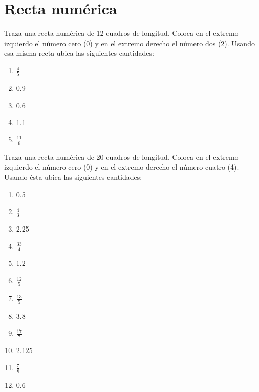 \documentclass[11pt]{article}
\begin{document}
\vspace{1cm}

\section{Recta num\'erica}

Traza una recta num\'erica de 12 cuadros de longitud. Coloca en el extremo
izquierdo el n\'umero cero (0) y en el extremo derecho el n\'umero dos (2).
Usando esa misma recta ubica las siguientes cantidades: \hspace{5mm}
\begin{multicols}{5}
\begin{enumerate}[label=\alph*)] \itemsep-.3em
\item $\displaystyle\frac{4}{5} $ \hspace{5mm} 
\item 0.9 \hspace{5mm} 
\item 0.6 \hspace{5mm} 
\item 1.1 \hspace{5mm}
\item $\displaystyle\frac{11}{6} $
\end{enumerate}
\end{multicols}

\vspace{1cm}

Traza una recta num\'erica de 20 cuadros de longitud. Coloca en el extremo
izquierdo el n\'umero cero (0) y en el extremo derecho el n\'umero cuatro (4).
Usando \'esta ubica las siguientes cantidades: \hspace{5mm}
\begin{multicols}{4}
\begin{enumerate}[label=\alph*)] 
\item 0.5  

\item $\displaystyle\frac{4}{3} $  

\item 2.25  

\item $\displaystyle\frac{33}{4} $ 

\item 1.2  

\item $\displaystyle\frac{12}{5} $  

\item $\displaystyle\frac{13}{5} $  

\item 3.8  

\item $\displaystyle\frac{17}{7} $  

\item 2.125  

\item $\displaystyle\frac{7}{8} $  

\item 0.6  

\end{enumerate}
\end{multicols}
\end{document}
